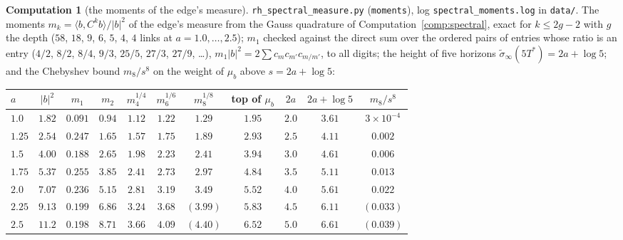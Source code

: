 \documentclass[11pt]{article}
\theoremstyle{definition}
\newtheorem{computation}[theorem]{Computation}
\theoremstyle{remark}
\newcommand{\Tst}{T^{*}}
\begin{document}
\begin{computation}[the moments of the edge's measure]\label{comp:moments}
\texttt{rh\_spectral\_measure.py} (\texttt{moments}), log \texttt{spectral\_moments.log} in \texttt{data/}. The moments $m_k=\langle b,C^kb\rangle/|b|^2$ of the edge's measure from the Gauss quadrature of Computation~\ref{comp:spectral}, exact for $k\le2g-2$ with $g$ the depth ($58$, $18$, $9$, $6$, $5$, $4$, $4$ links at $a=1.0,\dots,2.5$); $m_1$ checked against the direct sum over the ordered pairs of entries whose ratio is an entry ($4/2$, $8/2$, $8/4$, $9/3$, $25/5$, $27/3$, $27/9$, \dots), $m_1|b|^2=2\sum c_mc_{m'}c_{m/m'}$, to all digits; the height of five horizons $\tilde\sigma_\infty(5\Tst)=2a+\log5$; and the Chebyshev bound $m_8/s^8$ on the weight of $\mu_b$ above $s=2a+\log5$:
\begin{center}\footnotesize
\begin{tabular}{@{}lcccccccccc@{}}
\toprule
$a$ & $|b|^2$ & $m_1$ & $m_2$ & $m_4^{1/4}$ & $m_6^{1/6}$ & $m_8^{1/8}$ & top of $\mu_b$ & $2a$ & $2a+\log5$ & $m_8/s^8$\\
\midrule
$1.0$ & $1.82$ & $0.091$ & $0.94$ & $1.12$ & $1.22$ & $1.29$ & $1.95$ & $2.0$ & $3.61$ & $3\times10^{-4}$\\
$1.25$ & $2.54$ & $0.247$ & $1.65$ & $1.57$ & $1.75$ & $1.89$ & $2.93$ & $2.5$ & $4.11$ & $0.002$\\
$1.5$ & $4.00$ & $0.188$ & $2.65$ & $1.98$ & $2.23$ & $2.41$ & $3.94$ & $3.0$ & $4.61$ & $0.006$\\
$1.75$ & $5.37$ & $0.255$ & $3.85$ & $2.41$ & $2.73$ & $2.97$ & $4.84$ & $3.5$ & $5.11$ & $0.013$\\
$2.0$ & $7.07$ & $0.236$ & $5.15$ & $2.81$ & $3.19$ & $3.49$ & $5.52$ & $4.0$ & $5.61$ & $0.022$\\
$2.25$ & $9.13$ & $0.199$ & $6.86$ & $3.24$ & $3.68$ & $(3.99)$ & $5.83$ & $4.5$ & $6.11$ & $(0.033)$\\
$2.5$ & $11.2$ & $0.198$ & $8.71$ & $3.66$ & $4.09$ & $(4.40)$ & $6.52$ & $5.0$ & $6.61$ & $(0.039)$\\
\bottomrule
\end{tabular}
\end{center}

\end{computation}
\end{document}
